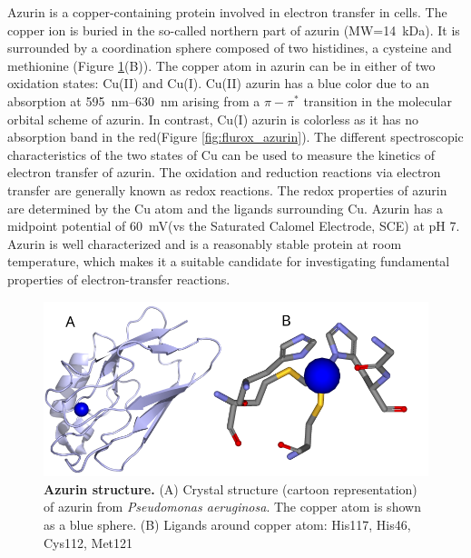 Azurin is a copper-containing protein involved in electron transfer in cells.\cite{dennison2005investigating,kolczak2006handbook}
The copper ion is buried in the so-called northern part of azurin (MW=\SI{14}{\kilo\dalton}).
It is surrounded by a coordination sphere composed of two histidines, a cysteine and methionine (Figure \ref{fig:azurin_structure}(B)).
The copper atom in azurin can be in either of two oxidation states: Cu(II) and Cu(I).
Cu(II) azurin has a blue color due to an absorption at \SIrange{595}{630}{\nm} arising from a $\pi - \pi^*$ transition in the molecular orbital scheme of azurin.\cite{dooley1981spectroscopic,schmauder2005sensitive}
In contrast, Cu(I) azurin is colorless as it has no absorption band in the red(Figure \ref{fig:flurox_azurin}).
The different spectroscopic characteristics of the two states of Cu can be used to measure the kinetics of electron transfer of azurin.
The oxidation and reduction reactions via electron transfer are generally known as redox reactions.
The redox properties of azurin are determined by the Cu atom and the ligands surrounding Cu.
Azurin has a midpoint potential of \SI{60}{\mV}(vs the Saturated Calomel Electrode, SCE) at pH 7.
Azurin is well characterized and is a reasonably stable protein at room temperature, which makes it a suitable candidate for investigating fundamental properties of electron-transfer reactions.
\begin{figure}
	\centering
	\includegraphics[width=\textwidth]{azurin_structure}
	\caption{\textbf{Azurin structure.} (A) Crystal structure (cartoon representation) of azurin from \textit{Pseudomonas aeruginosa}.\cite{adman1981structural}
	The copper atom is shown as a blue sphere.
	(B) Ligands around copper atom: His117, His46, Cys112, Met121}
	\label{fig:azurin_structure}
\end{figure}


